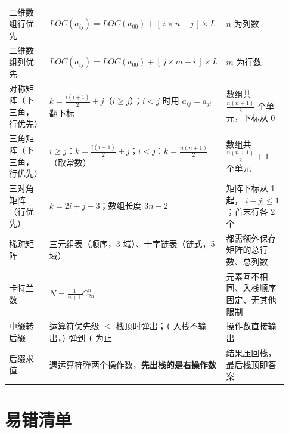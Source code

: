 \documentclass[11pt,openany,UTF8]{ctexbook}
\begin{document}
\begin{longtable}{@{}L{0.1724\linewidth}L{0.5086\linewidth}L{0.2475\linewidth}@{}}
二维数组行优先 & $LOC(a_{ij}) = LOC(a_{00}) + [\,i \times n + j\,] \times L$ & $n$ 为列数 \\
二维数组列优先 & $LOC(a_{ij}) = LOC(a_{00}) + [\,j \times m + i\,] \times L$ & $m$ 为行数 \\
对称矩阵（下三角，行优先） & $k = \frac{i(i+1)}{2} + j$（$i \ge j$）；$i<j$ 时用 $a_{ij}=a_{ji}$ 翻下标 & 数组共 $\frac{n(n+1)}{2}$ 个单元，下标从 0 \\
三角矩阵（下三角，行优先） & $i \ge j$：$k = \frac{i(i+1)}{2} + j$；$i<j$：$k=\frac{n(n+1)}{2}$（取常数） & 数组共 $\frac{n(n+1)}{2}+1$ 个单元 \\
三对角矩阵（行优先） & $k = 2i + j - 3$；数组长度 $3n-2$ & 矩阵下标从 1 起，$\lvert i-j \rvert \le 1$；首末行各 2 个 \\
稀疏矩阵 & 三元组表（顺序，3 域）、十字链表（链式，5 域） & 都需额外保存矩阵的总行数、总列数 \\
卡特兰数 & $N = \frac{1}{n+1}C_{2n}^{n}$ & 元素互不相同、入栈顺序固定、无其他限制 \\
中缀转后缀 & 运算符优先级 $\le$ 栈顶时弹出；\texttt{(} 入栈不输出，\texttt{)\allowbreak{}} 弹到 \texttt{(} 为止 & 操作数直接输出 \\
后缀求值 & 遇运算符弹两个操作数，\textbf{先出栈的是右操作数} & 结果压回栈，最后栈顶即答案 \\
\bottomrule
\end{longtable}
\endgroup

\section*{易错清单}
\end{document}
